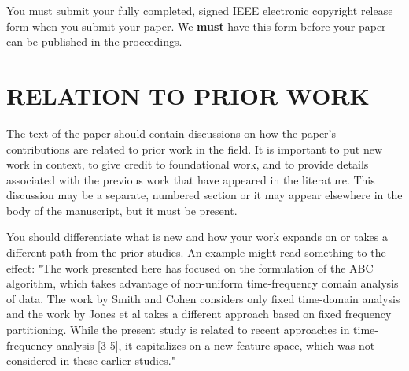 \documentclass{article}
\begin{document}
You must submit your fully completed, signed IEEE electronic copyright release
form when you submit your paper. We {\bf must} have this form before your paper
can be published in the proceedings.

\section{RELATION TO PRIOR WORK}
\label{sec:prior}

The text of the paper should contain discussions on how the paper's
contributions are related to prior work in the field. It is important
to put new work in  context, to give credit to foundational work, and
to provide details associated with the previous work that have appeared
in the literature. This discussion may be a separate, numbered section
or it may appear elsewhere in the body of the manuscript, but it must
be present.

You should differentiate what is new and how your work expands on
or takes a different path from the prior studies. An example might
read something to the effect: "The work presented here has focused
on the formulation of the ABC algorithm, which takes advantage of
non-uniform time-frequency domain analysis of data. The work by
Smith and Cohen \cite{Lamp86} considers only fixed time-domain analysis and
the work by Jones et al \cite{C2} takes a different approach based on
fixed frequency partitioning. While the present study is related
to recent approaches in time-frequency analysis [3-5], it capitalizes
on a new feature space, which was not considered in these earlier
studies."

\vfill\pagebreak

  
\end{document}
